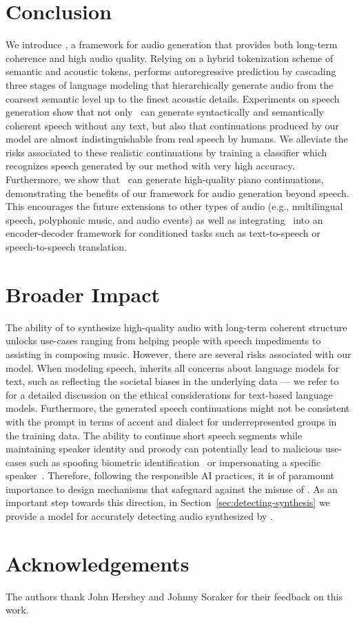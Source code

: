 \documentclass[letterpaper,10 pt]{IEEEtran}
\begin{document}
\section{Conclusion}
We introduce \ours{}, a framework for audio generation that provides both long-term coherence and high audio quality. Relying on a hybrid tokenization scheme of semantic and acoustic tokens, \ours{} performs autoregressive prediction by cascading three stages of language modeling that hierarchically generate audio from the coarsest semantic level up to the finest acoustic details. Experiments on speech generation show that not only~\ours{} can generate syntactically and semantically coherent speech without any text, but also that continuations produced by our model are almost indistinguishable from real speech by humans. We alleviate the risks associated to these realistic continuations by training a classifier which recognizes speech generated by our method with very high accuracy. Furthermore, we show that~\ours{} can generate high-quality piano continuations, demonstrating the benefits of our framework for audio generation beyond speech. This encourages the future extensions to other types of audio (e.g., multilingual speech, polyphonic music, and audio events) as well as integrating~\ours{} into an encoder-decoder framework for conditioned tasks such as text-to-speech or speech-to-speech translation.

\section{Broader Impact} \label{sec:broader-impact}
The ability of \ours{} to synthesize high-quality audio with long-term coherent structure unlocks use-cases ranging from helping people with speech impediments to assisting in composing music. However, there are several risks associated with our model. When modeling speech, \ours{} inherits all concerns about language models for text, such as reflecting the societal biases in the underlying data --- we refer to~\cite{palm} for a detailed discussion on the ethical considerations for text-based language models. Furthermore, the generated speech continuations might not be consistent with the prompt in terms of accent and dialect for underrepresented groups in the training data. 
The ability to continue short speech segments while maintaining speaker identity and prosody can potentially lead to malicious use-cases such as spoofing biometric identification~\cite{asvspoof21} or impersonating a specific speaker~\cite{yourtts}. Therefore, following the responsible AI practices, it is of paramount importance to design mechanisms that safeguard against the misuse of \ours{}. As an important step towards this direction, in Section~\ref{sec:detecting-synthesis} we provide a model for accurately detecting audio synthesized by \ours{}. 

\section{Acknowledgements}
The authors thank John Hershey and Johnny Soraker for their feedback on this work.



\end{document}
